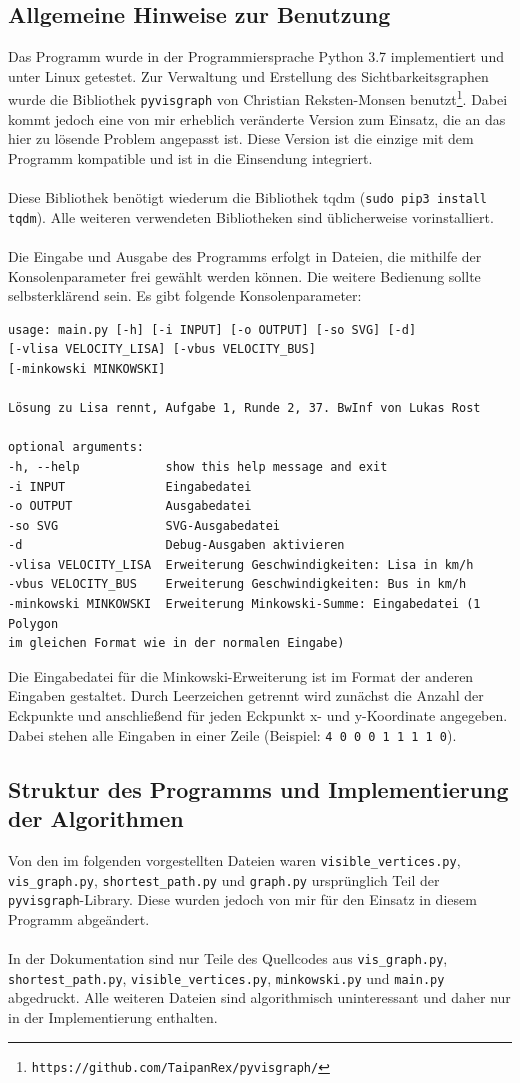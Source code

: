 \documentclass[a4paper, notitlepage, 12pt]{scrartcl}
\begin{document}
\subsection{Allgemeine Hinweise zur Benutzung}
Das Programm wurde in der Programmiersprache Python 3.7 implementiert und unter Linux getestet. Zur Verwaltung und Erstellung des Sichtbarkeitsgraphen wurde die Bibliothek \texttt{pyvisgraph} von Christian Reksten-Monsen benutzt\footnote{\texttt{https://github.com/TaipanRex/pyvisgraph/}}. Dabei kommt jedoch eine von mir erheblich veränderte Version zum Einsatz, die an das hier zu lösende Problem angepasst ist. Diese Version ist die einzige mit dem Programm kompatible und ist in die Einsendung integriert. \\ \\ Diese Bibliothek benötigt wiederum die Bibliothek tqdm (\texttt{sudo pip3 install tqdm}). Alle weiteren verwendeten Bibliotheken sind üblicherweise vorinstalliert. \\ \\
Die Eingabe und Ausgabe des Programms erfolgt in Dateien, die mithilfe der Konsolenparameter frei gewählt werden können. Die weitere Bedienung sollte selbsterklärend sein. Es gibt folgende Konsolenparameter:
\begin{verbatim}
usage: main.py [-h] [-i INPUT] [-o OUTPUT] [-so SVG] [-d]
[-vlisa VELOCITY_LISA] [-vbus VELOCITY_BUS]
[-minkowski MINKOWSKI]

Lösung zu Lisa rennt, Aufgabe 1, Runde 2, 37. BwInf von Lukas Rost

optional arguments:
-h, --help            show this help message and exit
-i INPUT              Eingabedatei
-o OUTPUT             Ausgabedatei
-so SVG               SVG-Ausgabedatei
-d                    Debug-Ausgaben aktivieren
-vlisa VELOCITY_LISA  Erweiterung Geschwindigkeiten: Lisa in km/h
-vbus VELOCITY_BUS    Erweiterung Geschwindigkeiten: Bus in km/h
-minkowski MINKOWSKI  Erweiterung Minkowski-Summe: Eingabedatei (1 Polygon
im gleichen Format wie in der normalen Eingabe)
\end{verbatim}
Die Eingabedatei für die Minkowski-Erweiterung ist im Format der anderen Eingaben gestaltet. Durch Leerzeichen getrennt wird zunächst die Anzahl der Eckpunkte und anschließend für jeden Eckpunkt x- und y-Koordinate angegeben. Dabei stehen alle Eingaben in einer Zeile (Beispiel: \texttt{4 0 0 0 1 1 1 1 0}).
\subsection{Struktur des Programms und Implementierung der Algorithmen}
Von den im folgenden vorgestellten Dateien waren \texttt{visible\_vertices.py}, \texttt{vis\_graph.py}, \texttt{shortest\_path.py} und \texttt{graph.py} ursprünglich Teil der \texttt{pyvisgraph}-Library. Diese wurden jedoch von mir für den Einsatz in diesem Programm abgeändert. \\ \\
In der Dokumentation sind nur Teile des Quellcodes aus \texttt{vis\_graph.py}, \texttt{shortest\_path.py}, \texttt{visible\_vertices.py}, \texttt{minkowski.py} und \texttt{main.py} abgedruckt. Alle weiteren Dateien sind algorithmisch uninteressant und daher nur in der Implementierung enthalten.
\end{document}
